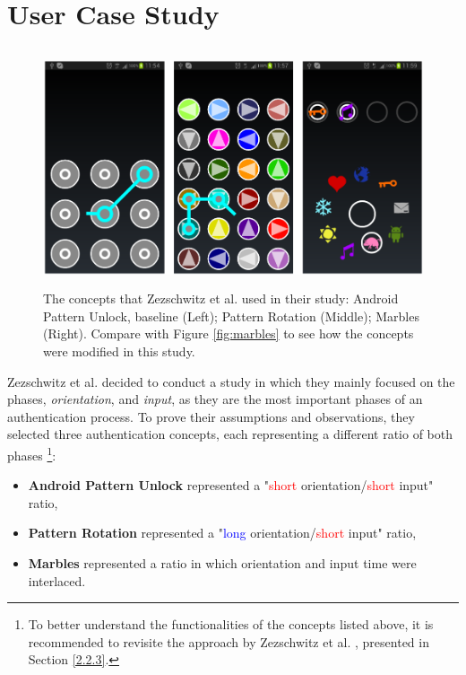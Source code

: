 \section{User Case Study}

\begin{figure}[t!]
\centering
\includegraphics[width=14cm, height=7cm]{Chapters/graphics/androidPatternMarble.PNG}
\caption{The concepts that Zezschwitz et al. \cite{Zezschwitz} used in their study: Android Pattern Unlock, baseline (Left); Pattern Rotation (Middle); Marbles (Right). Compare with Figure \ref{fig:marbles} to see how the concepts were modified in this study.}
\label{fig:android}
\end{figure}

Zezschwitz et al. \cite{Zezschwitz} decided to conduct a study in which they mainly focused on the phases, \textit{orientation}, and \textit{input}, as they are the most important phases of an authentication process. To prove their assumptions and observations, they selected three authentication concepts, each representing a different ratio of both phases \cite{Zezschwitz}\footnote{To better understand the functionalities of the concepts listed above, it is recommended to revisite the approach by Zezschwitz et al. \cite{Marbles}, presented in Section \ref{2.2.3}.}: 

\begin{itemize}
    \item \textbf{Android Pattern Unlock} represented a "\textcolor{red}{short} orientation/\textcolor{red}{short} input" ratio,
    \item \textbf{Pattern Rotation} represented a "\textcolor{blue}{long} orientation/\textcolor{red}{short} input" ratio,
    \item \textbf{Marbles} represented a ratio in which orientation and input time were interlaced.
\end{itemize}

